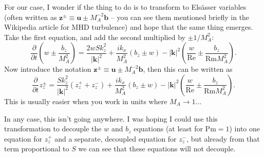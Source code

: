 \documentclass[aps,pop,preprint]{revtex4}
\begin{document}
For our case, I wonder if the thing to do is to transform to Els\"{a}sser variables (often written as $\mathbf{z}^{\pm} \equiv \mathbf{u} \pm M_A^{-2} \mathbf{b}$ -- you can see them mentioned briefly in the Wikipedia article for MHD turbulence) and hope that the same thing emerges. Take the first equation, and add the second multiplied by $\pm 1/M_A^2$:
\begin{equation}
    \frac{\partial}{\partial t} \left( w \pm \frac{b_z}{M_A^2} \right) = \frac{2wSk_z^2}{|\mathbf{k}|^2} + \frac{i k_x}{M_A^2} (b_z \pm w) - |\mathbf{k}|^2 \left( \frac{w}{\mathrm{Re}} \pm \frac{b_z}{\mathrm{Rm}M_A^2} \right).
\end{equation}
Now introduce the notation $\mathbf{z}^{\pm} \equiv \mathbf{u} \pm M_A^{-2} \mathbf{b}$, then this can be written as
\begin{equation}
    \frac{\partial}{\partial t} z_z^{\pm} = \frac{Sk_z^2}{|\mathbf{k}|^2}(z_z^+ + z_z^-) + \frac{i k_x}{M_A^2} (b_z \pm w) - |\mathbf{k}|^2 \left( \frac{w}{\mathrm{Re}} \pm \frac{b_z}{\mathrm{Rm}M_A^2} \right).
\end{equation}
This is usually easier when you work in units where $M_A \to 1$...

In any case, this isn't going anywhere. I was hoping I could use this transformation to decouple the $w$ and $b_z$ equations (at least for $\mathrm{Pm} = 1$) into one equation for $z_z^+$ and a separate, decoupled equation for $z_z^-$, but already from that term proportional to $S$ we can see that these equations will not decouple.
\end{document}

